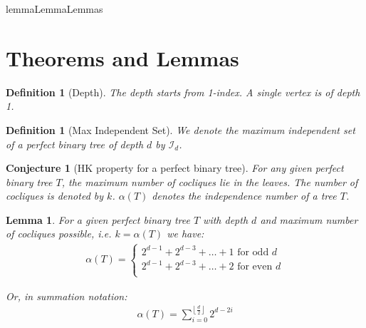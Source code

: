 \documentclass{article}
\newtheorem{lemma}[theorem]{Lemma}
\newtheorem{conjecture}[theorem]{Conjecture}
\newtheorem{definition}[theorem]{Definition}
\theoremstyle{definition}
\begin{document}
\refname{lemma}{Lemma}{Lemmas}
\section{Theorems and Lemmas}

\begin{definition}[Depth]
	The depth starts from 1-index. A single vertex is of depth 1.
\end{definition}

\begin{definition}[Max Independent Set]
	We denote the maximum independent set of a perfect binary tree of depth $d$ by $\mathcal{I}_d$.
\end{definition}

\begin{conjecture}[HK property for a perfect binary tree]
	For any given perfect binary tree $T$, the maximum number of cocliques lie in the leaves. The number of cocliques is denoted by $k$. $\alpha(T)$ denotes the independence number of a tree $T$.
\end{conjecture}

\begin{lemma}\label{independence_num}
	For a given perfect binary tree $T$ with depth $d$ and maximum number of cocliques possible, i.e. $k = \alpha(T)$ we have:
	\begin{align*}
		\alpha(T) = \begin{cases}
			            2^{d - 1} + 2^{d-3} + \ldots + 1 \text{ for odd $d$}  \\
			            2^{d - 1} + 2^{d-3} + \ldots + 2 \text{ for even $d$} \\
		            \end{cases}
	\end{align*}

	Or, in summation notation:
	\begin{align*}
		\alpha(T) = \sum_{i= 0}^{\left\lfloor\frac{d}{2}\right\rfloor} 2^{d - 2i}
	\end{align*}
\end{lemma}
\end{document}
